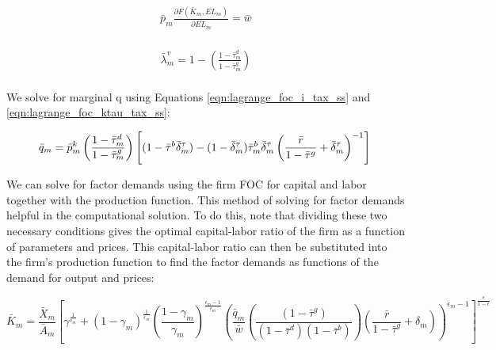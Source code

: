 \documentclass[letterpaper,12pt]{article}
\theoremstyle{definition}
\begin{document}
\begin{spacing}{1.5}
\begin{equation}
\label{eqn:lagrange_foc_l_tax_ss}
\begin{split}
  \bar{p}_{m}\frac{\partial F(\bar{K}_{m},\overline{EL}_{m})}{\partial \overline{EL}_{m}} = \bar{w}  \\
\end{split}
\end{equation}


\begin{equation}
\label{eqn:lagrange_foc_vn_tax2_ss}
\begin{split}
 \bar{\lambda}^{v}_{m} = 1 - \left(\frac{1-\bar{\tau}^{d}_{m}}{1-\bar{\tau}^{g}_{m}}\right)   \\
\end{split}
\end{equation}


We solve for marginal q using Equations \ref{eqn:lagrange_foc_i_tax_ss} and \ref{eqn:lagrange_foc_ktau_tax_ss}:

\begin{equation}
\label{eqn:q_tax_ss}
 \bar{q}_{m} = \bar{p}^{k}_{m}\left(\frac{1-\bar{\tau}^{d}_{m}}{1-\bar{\tau}^{g}_{m}}\right)\left[(1-\bar{\tau}^{b}\bar{\delta}^{\tau}_{m}) - (1-\bar{\delta}^{\tau}_{m})\bar{\tau}^{b}_{m}\bar{\delta}^{\tau}_{m}\left(\frac{\bar{r}}{1-\bar{\tau}^{g}}+\bar{\delta}^{\tau}_{m}\right)^{-1} \right]  \\
\end{equation}


We can solve for factor demands using the firm FOC for capital and labor together with the production function.  This method of solving for factor demands helpful in the computational solution.  To do this, note that dividing these two necessary conditions gives the optimal capital-labor ratio of the firm as a function of parameters and prices.  This capital-labor ratio can then be substituted into the firm's production function to find the factor demands as functions of the demand for output and prices: 

\begin{equation}
\label{eqn:k_demand_tax_ss}
\bar{K}_{m} = \frac{\bar{X}_{m}}{\bar{A}_{m}}\left[\gamma^{\frac{1}{\epsilon_{m}}} + (1-\gamma_{m})^{\frac{1}{\epsilon_{m}}}\left(\frac{1-\gamma_{m}}{\gamma_{m}}\right)^{\frac{\epsilon_{m}-1}{\epsilon_{m}}}\left(\frac{\bar{q}_{m}}{\bar{w}}\left(\frac{(1-\bar{\tau}^{g})}{(1-\bar{\tau}^{d})(1-\bar{\tau}^{b})}\right)\left(\frac{\bar{r}}{1-\bar{\tau}^{g}}+\delta_{m}\right)\right)^{\epsilon_{m}-1} \right]^{\frac{\epsilon}{1-\epsilon}}
\end{equation}


\end{spacing}
\end{document}
